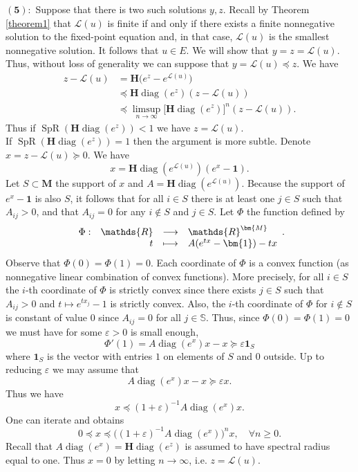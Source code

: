\documentclass[reqno,final,11pt]{amsart}
\theoremstyle{plain}
\theoremstyle{definition}
\theoremstyle{remark}
\newcommand{\R}{\mathds{R}}
\newcommand{\M}{\bm{M}}
\renewcommand{\L}{\bm{\mathscr{L}}}
\newcommand{\ones}{\bm{1}}
\renewcommand{\S}{\mathbb{S}}
\renewcommand{\H}{\bm{H}}
\newcommand{\fonction}[5]{\begin{array}[t]{lrcl}
#1: & #2 & \longrightarrow & #3 \\
    & #4 & \longmapsto & #5 \end{array}}
\DeclareMathOperator{\diag}{diag}
\DeclareMathOperator{\spr}{SpR}
\begin{document}
$\bm{(5):}$ Suppose that there is two such solutions $y,z$. Recall by Theorem \ref{theorem1} that $\L(u)$ is finite if and only if there exists a finite nonnegative solution to the fixed-point equation and, in that case, $\L(u)$ is the smallest nonnegative solution. It follows that $u\in E$. We will show that $y=z=\L(u)$. Thus, without loss of generality we can suppose that $y=\L(u) \preceq z$. We have 
	\begin{align*}
		z - \L(u) & = \H\big( e^z-e^{\L(u)}\big) \\
		& \preceq \H \diag(e^z) (z-\L(u))\\
		& \preceq \limsup_{n\to\infty} \big[\H \diag(e^z)\big]^n (z-\L(u)).
	\end{align*}
	Thus if $\spr(\H \diag(e^z))<1$ we have $z = \L(u)$.\\
	If $\spr(\H \diag(e^z))=1$ then the argument is more subtle. Denote $x = z-\L(u) \succeq 0$. We have \[x = \H \diag(e^{\L(u)})(e^x-\ones).\] Let $S  \subset \M$ the support of $x$ and $A = \H \diag(e^{\L(u)})$. Because the support of $e^x-\ones$ is also $S$, it follows that for all $i\in S$ there is at least one $j\in S$ such that $A_{ij}>0$, and that $A_{ij}=0$ for any $i\notin S$ and $j\in S$. Let $\Phi$ the function defined by \[ \fonction{\Phi}{\R}{\R^{\M}}{t}{A(e^{tx}-\ones) - tx}.\] Observe that $\Phi(0)=\Phi(1)=0$. Each coordinate of $\Phi$ is a convex function (as nonnegative linear combination of convex functions). More precisely, for all $i\in S$ the $i$-th coordinate of $\Phi$ is strictly convex since there exists $j\in S$ such that $A_{ij} >0$ and $t\mapsto e^{tx_j}-1$ is strictly convex. Also, the $i$-th coordinate of $\Phi$ for $i\notin S$ is constant of value $0$ since $A_{ij} = 0$ for all $j\in\S$. Thus, since $\Phi(0) = \Phi(1) = 0$ we must have for some $\varepsilon > 0$ is small enough, \[\Phi'(1) = A \diag(e^{x})x-x \succeq \varepsilon \ones_{S}\] where $\ones_{S}$ is the vector with entries $1$ on elements of $S$ and $0$ outside. Up to reducing $\varepsilon$ we may assume that \[ A \diag(e^{x})x-x \succeq \varepsilon x.\] Thus we have \[ x \preceq (1+\varepsilon)^{-1} A \diag(e^{x})x.\] One can iterate and obtains \[0\preceq x \preceq \Big((1+\varepsilon)^{-1} A \diag(e^{x})\Big)^n x, \quad \forall n\geq 0.\] Recall that $A \diag(e^{x}) = \H \diag(e^z)$ is assumed to have spectral radius equal to one. Thus $x=0$ by letting $n\to\infty$, i.e. $z = \L(u)$.
	
\end{document}
